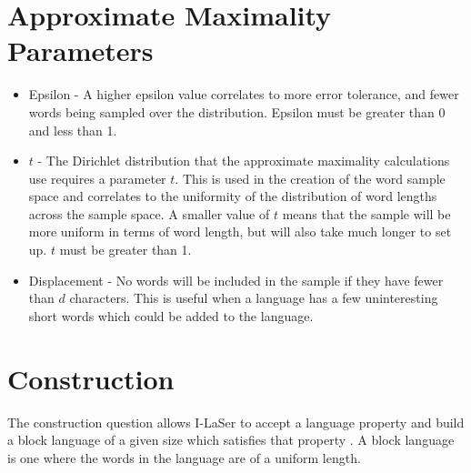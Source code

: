 \documentclass{article}
\begin{document}
\section{Approximate Maximality Parameters}
\begin{itemize}
\item Epsilon - A higher epsilon value correlates to more error tolerance, and fewer words being sampled over the distribution. Epsilon must be greater than 0 and less than 1.
\item $t$ - The Dirichlet distribution that the approximate maximality calculations use requires a parameter $t$.
This is used in the creation of the word sample space and correlates to the uniformity of the distribution of word lengths across the sample space. A smaller value of $t$ means that the sample will be more uniform in terms of word length, but will also take much longer to set up.
$t$ must be greater than 1.
\item Displacement - No words will be included in the sample if they have fewer than $d$ characters.
This is useful when a language has a few uninteresting short words which could be added to the language.
\end{itemize}

\section{Construction}
The construction question allows I-LaSer to accept a language property and build a block language of a given size which satisfies that property \cite{Construction}.
A block language is one where the words in the language are of a uniform length.
\end{document}
